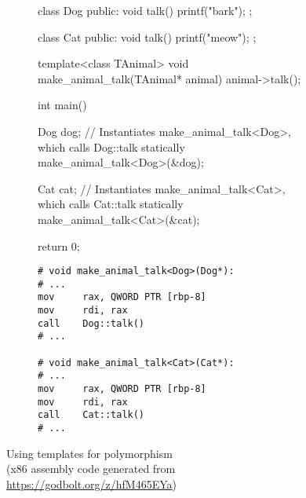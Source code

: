 \begin{figure}
    \centering
    \begin{subfigure}{0.49\linewidth}%
        \begin{cppcode}
class Dog {
public:
    void talk() {
        printf("bark\n");
    }
};

class Cat {
public:
    void talk() {
        printf("meow\n");
    }
};

template<class TAnimal>
void make_animal_talk(TAnimal* animal) {
    animal->talk();
}

int main() {
    Dog dog{};
    // Instantiates make_animal_talk<Dog>, which calls Dog::talk statically
    make_animal_talk<Dog>(&dog);

    Cat cat{};
    // Instantiates make_animal_talk<Cat>, which calls Cat::talk statically
    make_animal_talk<Cat>(&cat);

    return 0;
}
        \end{cppcode}
    \end{subfigure}%
    \begin{subfigure}{0.49\linewidth}%
        \begin{verbatim}
# void make_animal_talk<Dog>(Dog*):
# ...
mov     rax, QWORD PTR [rbp-8]
mov     rdi, rax
call    Dog::talk()
# ...
        
# void make_animal_talk<Cat>(Cat*):
# ...
mov     rax, QWORD PTR [rbp-8]
mov     rdi, rax
call    Cat::talk()
# ...
        \end{verbatim}
    \end{subfigure}%
    \caption{Using templates for polymorphism\\(x86 assembly code generated from \url{https://godbolt.org/z/hfM465EYa})}%
    \label{fig:templated_polymorphism}%
\end{figure}
